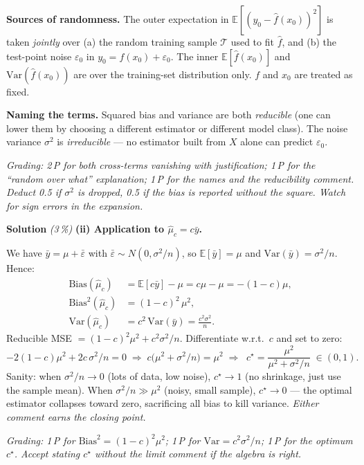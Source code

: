 \documentclass[11pt,a4paper]{article}
\newcommand{\subpoints}[1]{\textit{(#1\,\%)}}
\newcommand{\sol}{\noindent\textbf{Solution}}
\begin{document}
\textbf{Sources of randomness.}
The outer expectation in $\mathbb{E}[(y_0-\hat f(x_0))^2]$ is taken \emph{jointly} over (a) the
random training sample $\mathcal T$ used to fit $\hat f$, and (b) the test-point noise
$\varepsilon_0$ in $y_0=f(x_0)+\varepsilon_0$. The inner $\mathbb{E}[\hat f(x_0)]$ and
$\mathrm{Var}(\hat f(x_0))$ are over the training-set distribution only. $f$ and $x_0$ are treated
as fixed.

\textbf{Naming the terms.} Squared bias and variance are both \emph{reducible} (one can lower
them by choosing a different estimator or different model class). The noise variance $\sigma^2$ is
\emph{irreducible} --- no estimator built from $X$ alone can predict $\varepsilon_0$.

\noindent\emph{Grading: 2\,P for both cross-terms vanishing with justification; 1\,P for the
``random over what'' explanation; 1\,P for the names and the reducibility comment. Deduct 0.5 if
$\sigma^2$ is dropped, 0.5 if the bias is reported without the square. Watch for sign errors in
the expansion.}

\medskip
\sol{} \subpoints{3} \textbf{(ii) Application to $\hat\mu_c = c\bar y$.}

We have $\bar y = \mu + \bar\varepsilon$ with $\bar\varepsilon\sim N(0,\sigma^2/n)$, so
$\mathbb{E}[\bar y]=\mu$ and $\mathrm{Var}(\bar y)=\sigma^2/n$. Hence:
\begin{align*}
\mathrm{Bias}(\hat\mu_c) &= \mathbb{E}[c\bar y] - \mu = c\mu - \mu = -(1-c)\mu,\\
\mathrm{Bias}^2(\hat\mu_c) &= (1-c)^2\,\mu^2,\\
\mathrm{Var}(\hat\mu_c) &= c^2\,\mathrm{Var}(\bar y) = \frac{c^2\sigma^2}{n}.
\end{align*}
Reducible MSE $= (1-c)^2\mu^2 + c^2\sigma^2/n$. Differentiate w.r.t.\ $c$ and set to zero:
$$-2(1-c)\mu^2 + 2c\,\sigma^2/n = 0 \;\Longrightarrow\; c\bigl(\mu^2 + \sigma^2/n\bigr) = \mu^2
   \;\Longrightarrow\; \boxed{\;c^\star = \frac{\mu^2}{\mu^2 + \sigma^2/n}\;}\in(0,1).$$
Sanity: when $\sigma^2/n\to 0$ (lots of data, low noise), $c^\star\to 1$ (no shrinkage, just use
the sample mean). When $\sigma^2/n \gg \mu^2$ (noisy, small sample), $c^\star\to 0$ --- the
optimal estimator collapses toward zero, sacrificing all bias to kill variance. \emph{Either
comment earns the closing point.}

\noindent\emph{Grading: 1\,P for $\mathrm{Bias}^2 = (1-c)^2\mu^2$; 1\,P for
$\mathrm{Var}=c^2\sigma^2/n$; 1\,P for the optimum $c^\star$. Accept stating $c^\star$ without the
limit comment if the algebra is right.}
\end{document}
